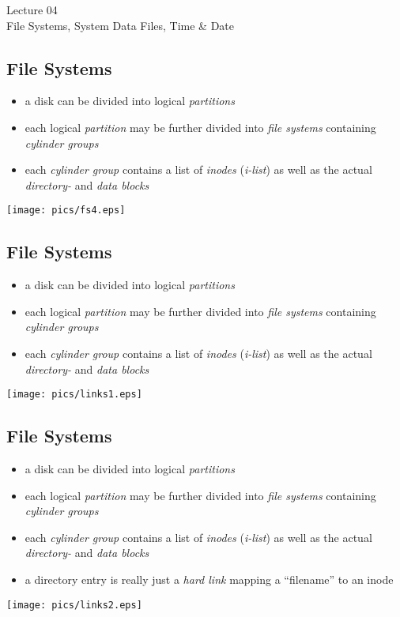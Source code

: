 \documentclass[xga]{xdvislides}
\begin{document}
\newpage

\vspace*{\fill}
\begin{center}
  \Hugesize
    Lecture 04
	\hspace*{5mm}\blueline\\ [1em]
	File Systems, System Data Files, Time \& Date
  \Normalsize
\end{center}
\vspace*{\fill}

\subsection{File Systems}
\begin{itemize}
	\item a disk can be divided into logical {\em partitions}
	\item each logical {\em partition} may be further divided into
		{\em file systems} containing {\em cylinder groups}
	\item each {\em cylinder group} contains a list of {\em inodes} ({\em i-list})
		as well as the actual {\em directory-} and {\em data blocks}
\end{itemize}
\texttt{[image: pics/fs4.eps]}

\subsection{File Systems}
\begin{itemize}
	\item a disk can be divided into logical {\em partitions}
	\item each logical {\em partition} may be further divided into
		{\em file systems} containing {\em cylinder groups}
	\item each {\em cylinder group} contains a list of {\em inodes} ({\em i-list})
		as well as the actual {\em directory-} and {\em data blocks}
\end{itemize}
\texttt{[image: pics/links1.eps]}

\subsection{File Systems}
\begin{itemize}
	\item a disk can be divided into logical {\em partitions}
	\item each logical {\em partition} may be further divided into
		{\em file systems} containing {\em cylinder groups}
	\item each {\em cylinder group} contains a list of {\em inodes} ({\em i-list})
		as well as the actual {\em directory-} and {\em data blocks}
	\item a directory entry is really just a {\em hard link} mapping a
		``filename'' to an inode
\end{itemize}
\texttt{[image: pics/links2.eps]}
\end{document}
